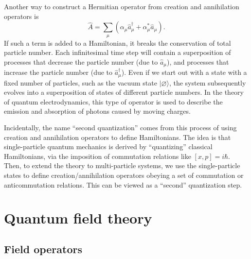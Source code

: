\documentclass[pra,12pt]{revtex4}
\begin{document}
Another way to construct a Hermitian operator from creation and
annihilation operators is
\begin{equation}
  \hat{A} = \sum_\mu \left(\alpha_\mu \hat{a}_\mu^\dagger + \alpha^*_\mu \hat{a}_\mu\right).
\end{equation}
If such a term is added to a Hamiltonian, it breaks the conservation
of total particle number.  Each infinitesimal time step will contain a
superposition of processes that decrease the particle number (due to
$\hat{a}_\mu$), and processes that increase the particle number (due
to $\hat{a}_\mu^\dagger$).  Even if we start out with a state with a
fixed number of particles, such as the vacuum state
$|\varnothing\rangle$, the system subsequently evolves into a
superposition of states of different particle numbers.  In the
theory of quantum electrodynamics, this type of operator is used to
describe the emission and absorption of photons caused by moving
charges.

Incidentally, the name ``second quantization'' comes from this process
of using creation and annihilation operators to define Hamiltonians.
The idea is that single-particle quantum mechanics is derived by
``quantizing'' classical Hamiltonians, via the imposition of
commutation relations like $[x,p] = i\hbar$.  Then, to extend the
theory to multi-particle systems, we use the single-particle states to
define creation/annihilation operators obeying a set of commutation or
anticommutation relations.  This can be viewed as a ``second''
quantization step.

\section{Quantum field theory}
\label{sec:qft}

\subsection{Field operators}
\end{document}
